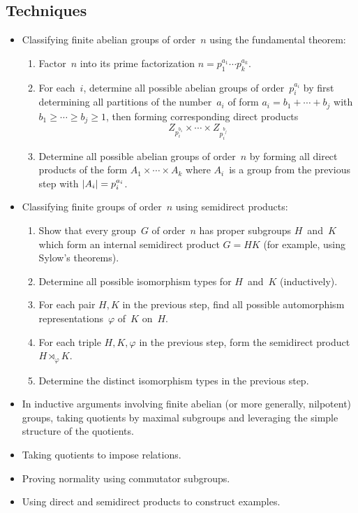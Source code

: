 \subsection*{Techniques}
\begin{itemize}[itemsep=0pt]
\item Classifying finite abelian groups of order~\(n\) using the fundamental theorem:
\begin{enumerate}[itemsep=0pt]
\item Factor~\(n\) into its prime factorization \(n=p_1^{a_1}\cdots p_k^{a_k}\).
\item For each~\(i\), determine all possible abelian groups of order~\(p_i^{a_i}\) by first determining all partitions of the number~\(a_i\) of form \(a_i=b_1+\cdots+b_j\) with \(b_1\ge\cdots\ge b_j\ge1\), then forming corresponding direct products
\[Z_{p_i^{b_1}}\times\cdots\times Z_{p_i^{b_j}}\]
\item Determine all possible abelian groups of order~\(n\) by forming all direct products of the form \(A_1\times\cdots\times A_k\) where \(A_i\)~is a group from the previous step with \(|{A_i}|=p_i^{a_i}\).
\end{enumerate}
\item Classifying finite groups of order~\(n\) using semidirect products:
\begin{enumerate}[itemsep=0pt]
\item Show that every group~\(G\) of order~\(n\) has proper subgroups \(H\)~and~\(K\) which form an internal semidirect product \(G=HK\) (for example, using Sylow's theorems).
\item Determine all possible isomorphism types for \(H\)~and~\(K\) (inductively).
\item For each pair \(H,K\) in the previous step, find all possible automorphism representations~\(\varphi\) of~\(K\) on~\(H\).
\item For each triple \(H,K,\varphi\) in the previous step, form the semidirect product \(H\rtimes_{\varphi}K\). 
\item Determine the distinct isomorphism types in the previous step.
\end{enumerate}
\item In inductive arguments involving finite abelian (or more generally, nilpotent) groups, taking quotients by maximal subgroups and leveraging the simple structure of the quotients.
\item Taking quotients to impose relations.
\item Proving normality using commutator subgroups.
\item Using direct and semidirect products to construct examples.
\end{itemize}
